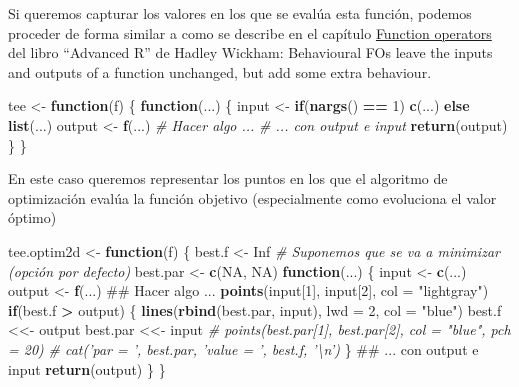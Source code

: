\documentclass[]{book}
\newenvironment{Shaded}{\begin{snugshade}}{\end{snugshade}}
\newcommand{\KeywordTok}[1]{\textcolor[rgb]{0.13,0.29,0.53}{\textbf{#1}}}
\newcommand{\DataTypeTok}[1]{\textcolor[rgb]{0.13,0.29,0.53}{#1}}
\newcommand{\DecValTok}[1]{\textcolor[rgb]{0.00,0.00,0.81}{#1}}
\newcommand{\StringTok}[1]{\textcolor[rgb]{0.31,0.60,0.02}{#1}}
\newcommand{\CommentTok}[1]{\textcolor[rgb]{0.56,0.35,0.01}{\textit{#1}}}
\newcommand{\OtherTok}[1]{\textcolor[rgb]{0.56,0.35,0.01}{#1}}
\newcommand{\ControlFlowTok}[1]{\textcolor[rgb]{0.13,0.29,0.53}{\textbf{#1}}}
\newcommand{\OperatorTok}[1]{\textcolor[rgb]{0.81,0.36,0.00}{\textbf{#1}}}
\newcommand{\NormalTok}[1]{#1}
\theoremstyle{definition}
\theoremstyle{definition}
\theoremstyle{definition}
\theoremstyle{remark}
\begin{document}
Si queremos capturar los valores en los que se evalúa esta función,
podemos proceder de forma similar a como se describe en el capítulo
\href{http://adv-r.had.co.nz/Function-operators.html\#behavioural-fos}{Function
operators} del libro ``Advanced R'' de Hadley Wickham: Behavioural FOs
leave the inputs and outputs of a function unchanged, but add some extra
behaviour.

\begin{Shaded}
\begin{Highlighting}[]
\NormalTok{tee <-}\StringTok{ }\ControlFlowTok{function}\NormalTok{(f) \{}
  \ControlFlowTok{function}\NormalTok{(...) \{}
\NormalTok{    input <-}\StringTok{ }\ControlFlowTok{if}\NormalTok{(}\KeywordTok{nargs}\NormalTok{() }\OperatorTok{==}\StringTok{ }\DecValTok{1}\NormalTok{) }\KeywordTok{c}\NormalTok{(...) }\ControlFlowTok{else} \KeywordTok{list}\NormalTok{(...)}
\NormalTok{    output <-}\StringTok{ }\KeywordTok{f}\NormalTok{(...)}
    \CommentTok{# Hacer algo ...}
    \CommentTok{# ... con output e input}
    \KeywordTok{return}\NormalTok{(output)}
\NormalTok{  \}}
\NormalTok{\}}
\end{Highlighting}
\end{Shaded}

En este caso queremos representar los puntos en los que el algoritmo de
optimización evalúa la función objetivo (especialmente como evoluciona
el valor óptimo)

\begin{Shaded}
\begin{Highlighting}[]
\NormalTok{tee.optim2d <-}\StringTok{ }\ControlFlowTok{function}\NormalTok{(f) \{}
\NormalTok{  best.f <-}\StringTok{ }\OtherTok{Inf}   \CommentTok{# Suponemos que se va a minimizar (opción por defecto)}
\NormalTok{  best.par <-}\StringTok{ }\KeywordTok{c}\NormalTok{(}\OtherTok{NA}\NormalTok{, }\OtherTok{NA}\NormalTok{)   }
  \ControlFlowTok{function}\NormalTok{(...) \{}
\NormalTok{    input <-}\StringTok{ }\KeywordTok{c}\NormalTok{(...)}
\NormalTok{    output <-}\StringTok{ }\KeywordTok{f}\NormalTok{(...)}
\NormalTok{    ## Hacer algo ...}
    \KeywordTok{points}\NormalTok{(input[}\DecValTok{1}\NormalTok{], input[}\DecValTok{2}\NormalTok{], }\DataTypeTok{col =} \StringTok{"lightgray"}\NormalTok{)}
    \ControlFlowTok{if}\NormalTok{(best.f }\OperatorTok{>}\StringTok{ }\NormalTok{output) \{}
      \KeywordTok{lines}\NormalTok{(}\KeywordTok{rbind}\NormalTok{(best.par, input), }\DataTypeTok{lwd =} \DecValTok{2}\NormalTok{, }\DataTypeTok{col =} \StringTok{"blue"}\NormalTok{)}
\NormalTok{      best.f <<-}\StringTok{ }\NormalTok{output}
\NormalTok{      best.par <<-}\StringTok{ }\NormalTok{input}
      \CommentTok{# points(best.par[1], best.par[2], col = "blue", pch = 20)}
      \CommentTok{# cat('par = ', best.par, 'value = ', best.f, '\textbackslash{}n')}
\NormalTok{    \} }
\NormalTok{    ## ... con output e input}
    \KeywordTok{return}\NormalTok{(output)}
\NormalTok{  \}}
\NormalTok{\}}
\end{Highlighting}
\end{Shaded}
\end{document}
